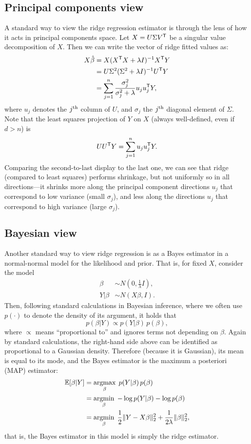 \documentclass{article}
\begin{document}
\subsection{Principal components view}

A standard way to view the ridge regression estimator is through the lens of how
it acts in principal components space. Let $X = U \Sigma V^{\mathsf{T}}$ be a singular
value decomposition of $X$. Then we can write the vector of ridge fitted values
as: 
\begin{align*}
X\hat{\beta} &= X (X^{\mathsf{T}} X + \lambda I)^{-1} X^{\mathsf{T}} Y \\
&= U \Sigma^2 (\Sigma^2 + \lambda I)^{-1} U^{\mathsf{T}} Y \\ 
&= \sum_{j=1}^n \frac{\sigma_j^2}{\sigma_j^2+\lambda} u_j u_j^{\mathsf{T}} Y,  
\end{align*}
where $u_j$ denotes the $j^{\text{th}}$ column of $U$, and $\sigma_j$ the $j^{\text{th}}$ diagonal 
element of $\Sigma$. Note that the least squares projection of $Y$ on $X$
(always well-defined, even if $d > n$) is
\[
U U^{\mathsf{T}} Y = \sum_{j=1}^n u_j u_j^{\mathsf{T}} Y.
\]
Comparing the second-to-last display to the last one, we can see that ridge 
(compared to least squares) performs shrinkage, but not uniformly so in all 
directions---it shrinks more along the principal component directions $u_j$ that
correspond to low variance (small $\sigma_j$), and less along the directions
$u_j$ that correspond to high variance (large $\sigma_j$).    

\subsection{Bayesian view}

Another standard way to view ridge regression is as a Bayes estimator in a 
normal-normal model for the likelihood and prior. That is, for fixed $X$,
consider the model 
\begin{equation}
\label{eq:normal_bayes}
\begin{aligned}
\beta &\sim N(0, \frac{1}{\lambda} I), \\
Y | \beta &\sim N(X\beta, I).
\end{aligned}
\end{equation}
Then, following standard calculations in Bayesian inference, where we often use
$p(\cdot)$ to denote the density of its argument, it holds that
\[
p(\beta | Y) \propto p(Y | \beta) \, p(\beta),
\]
where $\propto$ means ``proportional to'' and ignores terms not depending on
$\beta$. Again by standard calculations, the right-hand side above can be
identified as proportional to a Gaussian density. Therefore (because it is
Gaussian), its mean is equal to its mode, and the Bayes estimator is the maximum 
a posteriori (MAP) estimator:
\begin{align}
\nonumber
\mathbb{E}[\beta | Y] &= \mathop{\mathrm{argmax}}_\beta \; p(Y | \beta) \, p(\beta) \\
&= \mathop{\mathrm{argmin}}_\beta \; -\log p(Y | \beta) - \log p(\beta) \\
\label{eq:ridge_bayes}
&= \mathop{\mathrm{argmin}}_\beta \; \frac{1}{2} \|Y - X\beta\|_2^2 + \frac{1}{2\lambda}
  \|\beta\|_2^2,
\end{align}
that is, the Bayes estimator in this model is simply the ridge estimator. 
\end{document}
